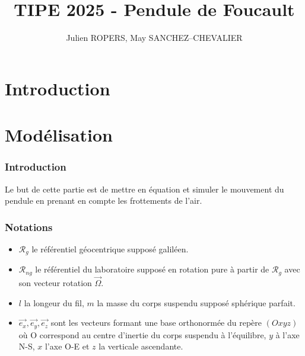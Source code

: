 \documentclass{article}
\begin{document}
	\title{TIPE 2025 - Pendule de Foucault}
	\author{Julien ROPERS, May SANCHEZ--CHEVALIER}
	\maketitle
	\tableofcontents
	\newpage
	\renewcommand{\partname}{Partie}
	\part{Introduction}
	
	\renewcommand{\partname}{Partie}
	\part{Modélisation}
	\section{Introduction}
	Le but de cette partie est de mettre en équation et simuler le mouvement du pendule en prenant en compte les frottements de l'air. 
	\section{Notations}
	\begin{itemize}
		\itemsep 0em 
		\item $\mathcal{R}_g$ le référentiel géocentrique supposé galiléen.
		\item $\mathcal{R}_{ng}$ le référentiel du laboratoire supposé en rotation pure à partir de $\mathcal{R}_g$ avec son vecteur rotation $\vec{\Omega}$.
		\item $l$ la longeur du fil, $m$ la masse du corps suspendu supposé sphérique parfait.
		\item $\vec{e_x},\vec{e_y},\vec{e_z}$ sont les vecteurs formant une base orthonormée du repère $(Oxyz)$ où O correspond au centre d'inertie du corps suspendu à l'équilibre, $y$ à l'axe N-S, $x$ l'axe O-E et $z$ la verticale ascendante.
	\end{itemize}
\end{document}

